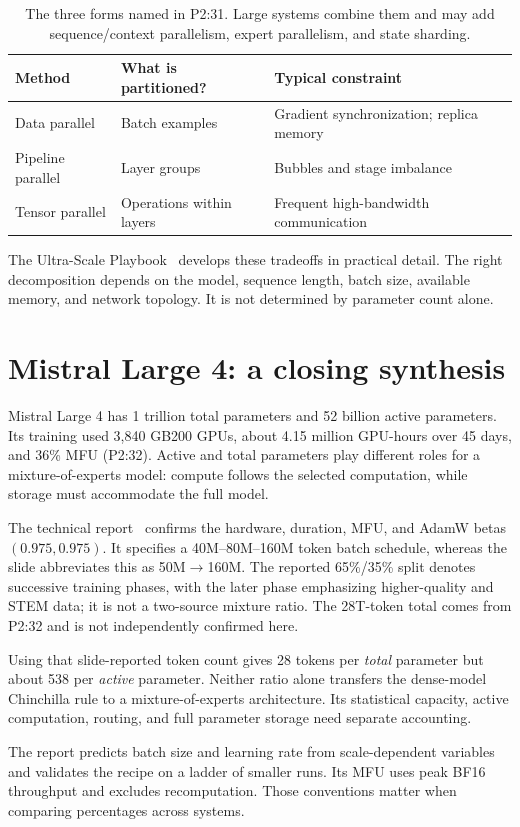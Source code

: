 \begin{table}[htbp]\centering\small
\begin{tabularx}{\linewidth}{lXX}
\toprule
Method&What is partitioned?&Typical constraint\\
\midrule
Data parallel&Batch examples&Gradient synchronization; replica memory\\
Pipeline parallel&Layer groups&Bubbles and stage imbalance\\
Tensor parallel&Operations within layers&Frequent high-bandwidth communication\\
\bottomrule
\end{tabularx}
\caption{The three forms named in P2:31. Large systems combine them and may add sequence/context parallelism, expert parallelism, and state sharding.}
\end{table}

The Ultra-Scale Playbook~\cite{ultrascale} develops these tradeoffs in practical detail. The right decomposition depends on the model, sequence length, batch size, available memory, and network topology. It is not determined by parameter count alone.

\section{Mistral Large 4: a closing synthesis}
Mistral Large 4 has 1 trillion total parameters and 52 billion active parameters. Its training used 3,840 GB200 GPUs, about 4.15 million GPU-hours over 45 days, and 36\% MFU (P2:32). Active and total parameters play different roles for a mixture-of-experts model: compute follows the selected computation, while storage must accommodate the full model.

The technical report~\cite{mistral4} confirms the hardware, duration, MFU, and AdamW betas $(0.975,0.975)$. It specifies a 40M--80M--160M token batch schedule, whereas the slide abbreviates this as 50M$\to$160M. The reported 65\%/35\% split denotes successive training phases, with the later phase emphasizing higher-quality and STEM data; it is not a two-source mixture ratio. The 28T-token total comes from P2:32 and is not independently confirmed here.

Using that slide-reported token count gives 28 tokens per \emph{total} parameter but about 538 per \emph{active} parameter. Neither ratio alone transfers the dense-model Chinchilla rule to a mixture-of-experts architecture. Its statistical capacity, active computation, routing, and full parameter storage need separate accounting.

The report predicts batch size and learning rate from scale-dependent variables and validates the recipe on a ladder of smaller runs. Its MFU uses peak BF16 throughput and excludes recomputation. Those conventions matter when comparing percentages across systems.

\FloatBarrier
